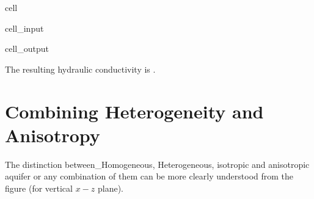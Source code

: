 \documentclass[letterpaper,10pt,english]{jupyterBook}
\begin{document}
\begin{sphinxuseclass}{cell}\begin{sphinxVerbatimInput}

\begin{sphinxuseclass}{cell_input}
\begin{sphinxVerbatim}[commandchars=\\\{\}]
   


\PYG{l+s+s2}{[1mSolution:}\PYG{l+s+s2}{[0m}\PYG{l+s+s2}{[1m}\PYG{l+s+s2}{[0m.}
\end{sphinxVerbatim}

\end{sphinxuseclass}\end{sphinxVerbatimInput}
\begin{sphinxVerbatimOutput}

\begin{sphinxuseclass}{cell_output}
\begin{sphinxVerbatim}[commandchars=\\\{\}]

The resulting hydraulic conductivity is .
\end{sphinxVerbatim}

\end{sphinxuseclass}\end{sphinxVerbatimOutput}

\end{sphinxuseclass}

\section{Combining Heterogeneity and Anisotropy}
\label{\detokenize{content/flow/L5/15_het_iso:combining-heterogeneity-and-anisotropy}}
\sphinxAtStartPar
The distinction between\_Homogeneous, Heterogeneous, isotropic and anisotropic aquifer or any combination of them can be more clearly understood from the figure (for vertical \(x-z\) plane).
\end{document}
